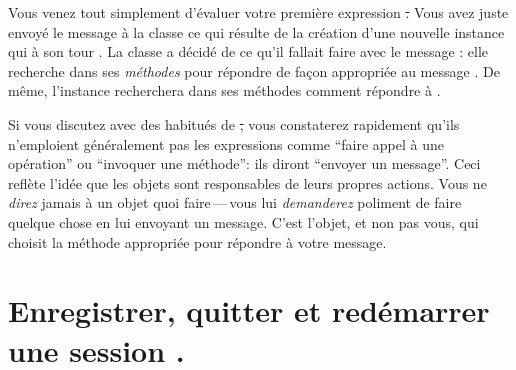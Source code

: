 \documentclass[a4paper,10pt,twoside]{book}
\begin{document}
Vous venez tout simplement d'évaluer votre première expression \st. 
Vous avez juste envoyé le message  à la classe \bam 
ce qui résulte de la création d'une nouvelle instance qui à 
son tour 
. %
La classe \bam{} a décidé de ce qu'il fallait faire avec le message
: elle recherche dans ses \emph{méthodes} pour répondre de
façon appropriée au message 
.
De même, l'instance \bam recherchera dans ses méthodes comment
répondre à .

Si vous discutez avec des habitués de \st, vous constaterez rapidement
qu'ils n'emploient généralement pas les expressions comme ``faire appel
à une opération'' ou ``invoquer une méthode'': ils diront ``envoyer
un message''.
Ceci reflète l'idée que les objets sont responsables de leurs propres actions.
Vous ne \emph{direz} jamais à un objet quoi faire\,---\,vous lui
\emph{demanderez} poliment de faire quelque chose en lui envoyant un message.
C'est l'objet, et non pas vous, qui choisit la méthode appropriée pour
répondre à votre message.

\section{Enregistrer, quitter et redémarrer une session \pharo.}
\end{document}
